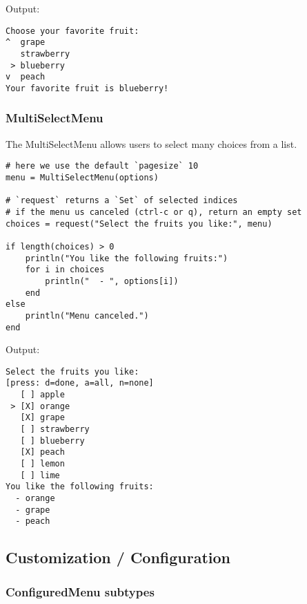 Output:




\begin{lstlisting}
Choose your favorite fruit:
^  grape
   strawberry
 > blueberry
v  peach
Your favorite fruit is blueberry!
\end{lstlisting}



\hypertarget{6295927836435212296}{}


\subsubsection{MultiSelectMenu}



The MultiSelectMenu allows users to select many choices from a list.




\begin{verbatim}
# here we use the default `pagesize` 10
menu = MultiSelectMenu(options)

# `request` returns a `Set` of selected indices
# if the menu us canceled (ctrl-c or q), return an empty set
choices = request("Select the fruits you like:", menu)

if length(choices) > 0
    println("You like the following fruits:")
    for i in choices
        println("  - ", options[i])
    end
else
    println("Menu canceled.")
end
\end{verbatim}



Output:




\begin{lstlisting}
Select the fruits you like:
[press: d=done, a=all, n=none]
   [ ] apple
 > [X] orange
   [X] grape
   [ ] strawberry
   [ ] blueberry
   [X] peach
   [ ] lemon
   [ ] lime
You like the following fruits:
  - orange
  - grape
  - peach
\end{lstlisting}



\hypertarget{664736390801158626}{}


\subsection{Customization / Configuration}



\hypertarget{1622981429170752270}{}


\subsubsection{ConfiguredMenu subtypes}



